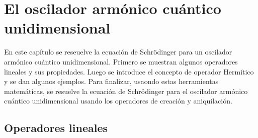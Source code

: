 \documentclass[letterpaper,12pt,oneside]{book}
\begin{document}
\chapter{El oscilador arm\'onico cu\'antico unidimensional}
%
En este cap\'itulo se reseuelve la ecuaci\'on de Schr\"odinger para un oscilador arm\'onico cu\'antico unidimensional. Primero se muestran algunos operadores lineales y sus propiedades. Luego se introduce el concepto de operador Herm\'itico y se dan algunos ejemplos. Para finalizar, usaondo estas herramientas matem\'aticas, se resuelve la ecuaci\'on de Schr\"odinger para el oscilador arm\'onico cu\'antico unidimensional usando los operadores de creaci\'on y aniquilaci\'on.


\section{Operadores lineales  }
\end{document}
